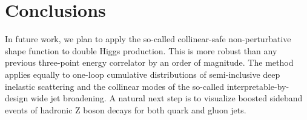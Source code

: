 \section{Conclusions}\label{sec:conclusions}

In future work, we plan to apply the so-called collinear-safe
non-perturbative shape function to double Higgs production. This is more
robust than any previous three-point energy correlator by an order of
magnitude. The method applies equally to one-loop cumulative
distributions of semi-inclusive deep inelastic scattering and the
collinear modes of the so-called interpretable-by-design wide jet
broadening. A natural next step is to visualize boosted sideband events
of hadronic Z boson decays for both quark and gluon jets.

